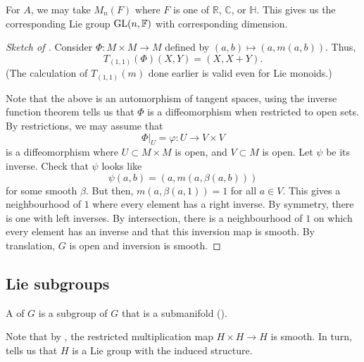 \documentclass[12pt]{article}
\begin{document}
\begin{ex} \label{ex:GL-examples}
	For $A$, we may take $M_{n}(F)$ where $F$ is one of $\mathbb{R}$, $\mathbb{C}$, or $\mathbb{H}$. \newline
	This gives us the corresponding Lie group $\operatorname{GL}(n, \mathbb{F})$ with corresponding dimension.
\end{ex}

\begin{proof}[Sketch of ]
	Consider $\Phi \colon M \times M \to M$ defined by $(a, b) \mapsto (a, m(a, b))$. \newline
	Thus,
	\begin{equation*} 
		T_{(1, 1)}(\Phi)(X, Y) = (X, X + Y).
	\end{equation*}
	(The calculation of $T_{(1, 1)}(m)$ done earlier is valid even for Lie monoids.)

	Note that the above is an automorphism of tangent spaces, using the inverse function theorem tells us that $\Phi$ is a diffeomorphism when restricted to open sets. By restrictions, we may assume that 
	\begin{equation*} 
		\Phi|_{U} = \varphi \colon U \to V \times V
	\end{equation*}
	is a diffeomorphism where $U \subset M \times M$ is open, and $V \subset M$ is open. \newline
	Let $\psi$ be its inverse. Check that $\psi$ looks like
	\begin{equation*} 
		\psi(a, b) = (a, m(a, \beta(a, b)))
	\end{equation*}
	for some smooth $\beta$. 
	But then, $m(a, \beta(a, 1)) = 1$ for all $a \in V$. 
	This gives a neighbourhood of $1$ where every element has a right inverse. 
	By symmetry, there is one with left inverses. 
	By intersection, there is a neighbourhood of $1$ on which every element has an inverse and that this inversion map is smooth. By translation, $G$ is open and inversion is smooth.
\end{proof}

\subsection{Lie subgroups}

\begin{defn}
	A  of $G$ is a subgroup of $G$ that is a submanifold ().
\end{defn}
\begin{rem}
	Note that by , the restricted multiplication map $H \times H \to H$ is smooth. 
	In turn,  tells us that $H$ is a Lie group with the induced structure.
\end{rem}
\end{document}
